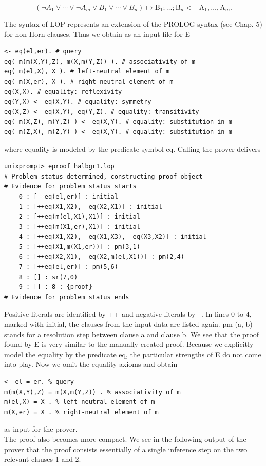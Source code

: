 \documentclass[10pt]{book}
\begin{document}
$$
\left(\neg A_{1} \vee \cdots \vee \neg A_{m} \vee B_{1} \vee \cdots \vee B_{n}\right) \mapsto \mathrm{B}_{1} ; \ldots ; \mathrm{B}_{n} <- \mathrm{A}_{1}, \ldots, \mathrm{A}_{m} .
$$

The syntax of LOP represents an extension of the PROLOG syntax (see Chap. 5) for non Horn clauses. Thus we obtain as an input file for E

\begin{verbatim}
<- eq(el,er). # query
eq( m(m(X,Y),Z), m(X,m(Y,Z)) ). # associativity of m
eq( m(el,X), X ). # left-neutral element of m
eq( m(X,er), X ). # right-neutral element of m
eq(X,X). # equality: reflexivity
eq(Y,X) <- eq(X,Y). # equality: symmetry
eq(X,Z) <- eq(X,Y), eq(Y,Z). # equality: transitivity
eq( m(X,Z), m(Y,Z) ) <- eq(X,Y). # equality: substitution in m
eq( m(Z,X), m(Z,Y) ) <- eq(X,Y). # equality: substitution in m
\end{verbatim}

where equality is modeled by the predicate symbol eq. Calling the prover delivers

\begin{verbatim}
unixprompt> eproof halbgr1.lop
# Problem status determined, constructing proof object
# Evidence for problem status starts
    0 : [--eq(el,er)] : initial
    1 : [++eq(X1,X2),--eq(X2,X1)] : initial
    2 : [++eq(m(el,X1),X1)] : initial
    3 : [++eq(m(X1,er),X1)] : initial
    4 : [++eq(X1,X2),--eq(X1,X3),--eq(X3,X2)] : initial
    5 : [++eq(X1,m(X1,er))] : pm(3,1)
    6 : [++eq(X2,X1),--eq(X2,m(el,X1))] : pm(2,4)
    7 : [++eq(el,er)] : pm(5,6)
    8 : [] : sr(7,0)
    9 : [] : 8 : {proof}
# Evidence for problem status ends
\end{verbatim}

Positive literals are identified by ++ and negative literals by --. In lines 0 to 4, marked with initial, the clauses from the input data are listed again. pm (a, b) stands for a resolution step between clause a and clause b. We see that the proof found by E is very similar to the manually created proof. Because we explicitly model the equality by the predicate eq, the particular strengths of E do not come into play. Now we omit the equality axioms and obtain

\begin{verbatim}
<- el = er. % query
m(m(X,Y),Z) = m(X,m(Y,Z)) . % associativity of m
m(el,X) = X . % left-neutral element of m
m(X,er) = X . % right-neutral element of m
\end{verbatim}

as input for the prover.\\
The proof also becomes more compact. We see in the following output of the prover that the proof consists essentially of a single inference step on the two relevant clauses 1 and 2.
\end{document}

